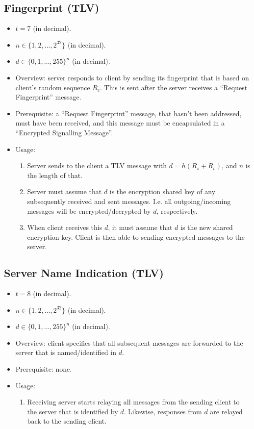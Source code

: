\documentclass{article}
\begin{document}
\subsection{Fingerprint (TLV)}
\begin{itemize}
    \item $t = 7$ (in decimal).
    \item $n \in \{1,2,\ldots,2^{32}\}$ (in decimal).
    \item $d \in \{0,1,\ldots,255\}^n$ (in decimal).
    \item Overview: server responds to client by sending its fingerprint that
    is based on client's random sequence $R_c$. This is sent after the server
    receives a ``Request Fingerprint'' message.
    \item Prerequisite: a ``Request Fingerprint'' message, that hasn't been
    addressed, must have been received, and this message must be encapsulated
    in a ``Encrypted Signalling Message''.
    \item Usage:
        \begin{enumerate}
            \item Server sends to the client a TLV message with $d=h(R_s+R_c)$,
            and $n$ is the length of that.
            \item Server must assume that $d$ is the encryption shared key of
            any subsequently received and sent messages. I.e. all
            outgoing/incoming messages will be encrypted/decrypted by $d$,
            respectively.
            \item When client receives this $d$, it must assume that $d$ is the
            new shared encryption key. Client is then able to sending encrypted
            messages to the server.
        \end{enumerate}
\end{itemize}

\subsection{Server Name Indication (TLV)}
\begin{itemize}
    \item $t = 8$ (in decimal).
    \item $n \in \{1,2,\ldots,2^{32}\}$ (in decimal).
    \item $d \in \{0,1,\ldots,255\}^n$ (in decimal).
    \item Overview: client specifies that all subsequent messages are forwarded
    to the server that is named/identified in $d$.
    \item Prerequisite: none.
    \item Usage:
        \begin{enumerate}
            \item Receiving server starts relaying all messages from the
            sending client to the server that is identified by $d$. Likewise,
            responses from $d$ are relayed back to the sending client.
        \end{enumerate}
\end{itemize}
\end{document}
